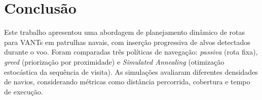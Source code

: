 




\section{Conclusão}

Este trabalho apresentou uma abordagem de planejamento dinâmico de rotas para VANTs em patrulhas navais, com inserção progressiva de alvos detectados durante o voo. Foram comparadas três políticas de navegação: \textit{passiva} (rota fixa), \textit{greed} (priorização por proximidade) e \textit{Simulated Annealing} (otimização estocástica da sequência de visita). As simulações avaliaram diferentes densidades de navios, considerando métricas como distância percorrida, cobertura e tempo de execução.

